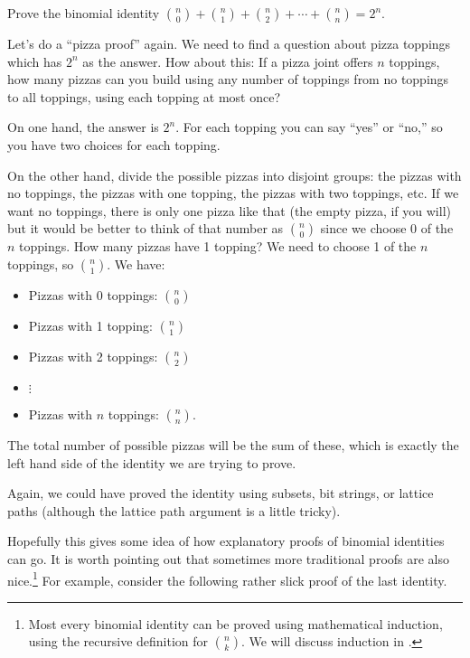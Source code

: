 \documentclass[12pt]{article}
\begin{document}
\begin{example}
  Prove the binomial identity ${n\choose 0} + {n \choose 1} + {n\choose 2} + \cdots + {n \choose n} = 2^n$.
  \begin{solution}
    Let's do a ``pizza proof'' again.  We need to find a question about pizza toppings which has $2^n$ as the answer.  How about this: If a pizza joint offers $n$ toppings, how many pizzas can you build using any number of toppings from no toppings to all toppings, using each topping at most once?

    On one hand, the answer is $2^n$.  For each topping you can say ``yes'' or ``no,'' so you have two choices for each topping.

    On the other hand, divide the possible pizzas into disjoint groups: the pizzas with no toppings, the pizzas with one topping, the pizzas with two toppings, etc.  If we want no toppings, there is only one pizza like that (the empty pizza, if you will) but it would be better to think of that number as ${n \choose 0}$ since we choose 0 of the $n$ toppings.  How many pizzas have 1 topping?  We need to choose 1 of the $n$ toppings, so ${n \choose 1}$.  We have:
    \begin{itemize}
      \item[] Pizzas with 0 toppings: ${n \choose 0}$
      \item[] Pizzas with 1 topping: ${n \choose 1}$
      \item[] Pizzas with 2 toppings: ${n \choose 2}$
      \item[] \qquad $\vdots$
      \item[] Pizzas with $n$ toppings: ${n \choose n}$.
    \end{itemize}
    The total number of possible pizzas will be the sum of these, which is exactly the left hand side of the identity we are trying to prove.

    Again, we could have proved the identity using subsets, bit strings, or lattice paths (although the lattice path argument is a little tricky).
  \end{solution}

\end{example}

Hopefully this gives some idea of how explanatory proofs of binomial identities can go.  It is worth pointing out that sometimes more traditional proofs are also nice.\footnote{Most every binomial identity can be proved using mathematical induction, using the recursive definition for ${n \choose k}$.  We will discuss induction in .}  For example, consider the following rather slick proof of the last identity.
\end{document}
